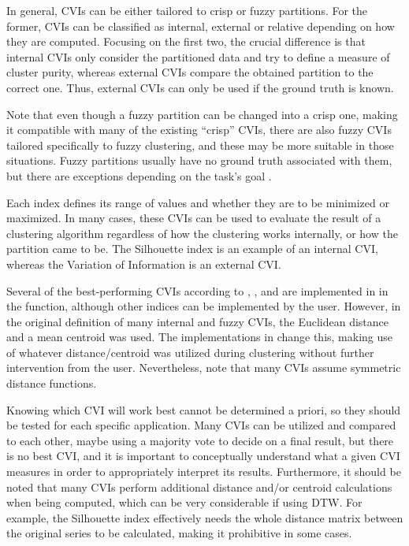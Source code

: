 In general, CVIs can be either tailored to crisp or fuzzy partitions.
For the former,
CVIs can be classified as internal, external or relative depending on how they are computed.
Focusing on the first two,
the crucial difference is that internal CVIs only consider the partitioned data and try to define a measure of cluster purity,
whereas external CVIs compare the obtained partition to the correct one.
Thus, external CVIs can only be used if the ground truth is known.

Note that even though a fuzzy partition can be changed into a crisp one,
making it compatible with many of the existing ``crisp'' CVIs,
there are also fuzzy CVIs tailored specifically to fuzzy clustering,
and these may be more suitable in those situations.
Fuzzy partitions usually have no ground truth associated with them,
but there are exceptions depending on the task's goal \citep{lei2017}.

Each index defines its range of values and whether they are to be minimized or maximized.
In many cases,
these CVIs can be used to evaluate the result of a clustering algorithm regardless of how the clustering works internally,
or how the partition came to be.
The Silhouette index \citep{rousseeuw1987} is an example of an internal CVI,
whereas the Variation of Information \citep{meilua2003} is an external CVI.

Several of the best-performing CVIs according to \citet{wang2007}, \citet{arbelaitz2013}, and \cite{lei2017} are implemented in \dtwclust{} in the  function,
although other indices can be implemented by the user.
However, in the original definition of many internal and fuzzy CVIs,
the Euclidean distance and a mean centroid was used.
The implementations in \dtwclust{} change this,
making use of whatever distance/centroid was utilized during clustering without further intervention from the user. %
Nevertheless, note that many CVIs assume symmetric distance functions.

Knowing which CVI will work best cannot be determined a priori,
so they should be tested for each specific application.
Many CVIs can be utilized and compared to each other,
maybe using a majority vote to decide on a final result,
but there is no best CVI,
and it is important to conceptually understand what a given CVI measures in order to appropriately interpret its results.
Furthermore, it should be noted that many CVIs perform additional distance and/or centroid calculations when being computed,
which can be very considerable if using DTW.
For example, the Silhouette index effectively needs the whole distance matrix between the original series to be calculated,
making it prohibitive in some cases.

